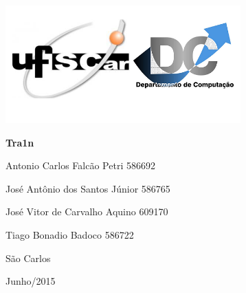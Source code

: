 \documentclass[a4paper]{article}
\date{}
\begin{document}
\clearpage\setcounter{page}{1}\pagestyle{Standard}
{\centering 
\includegraphics[width=3.5693in,height=1.7807in]{Tra1n-img/Tra1n-img1.png}
\par}


\bigskip


\bigskip


\bigskip


\bigskip

{\centering\color{black}
\textbf{Tra1n}
\par}


\bigskip


\bigskip


\bigskip


\bigskip

{\raggedleft\color{black}
Antonio Carlos Falcão Petri 586692
\par}

{\raggedleft\color{black}
José Antônio dos Santos Júnior 586765
\par}

{\raggedleft\color{black}
José Vitor de Carvalho Aquino 609170
\par}

{\raggedleft\color{black}
Tiago Bonadio Badoco 586722
\par}


\bigskip


\bigskip


\bigskip


\bigskip


\bigskip


\bigskip


\bigskip


\bigskip


\bigskip


\bigskip


\bigskip


\bigskip

{\centering\color{black}
São Carlos
\par}

{\centering\color{black}
Junho/2015
\par}
\end{document}

